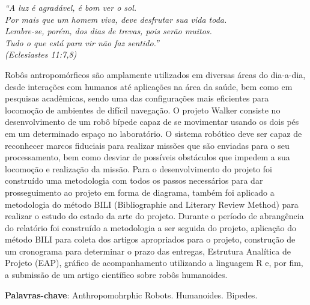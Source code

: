 \documentclass[
	12pt,				%
	openright,			%
	twoside,			%
	a4paper,			%
	english,			%
	french,				%
	spanish,			%
	brazil				%
	]{senai-cimatec-abntex2}
\begin{document}
\begin{epigrafe}
	\vspace*{\fill}
	\begin{flushright}
		\textit{``A luz é agradável, é bom ver o sol.\\
			Por mais que um homem viva, deve desfrutar sua vida toda.\\ Lembre-se, porém, dos dias de trevas, pois serão muitos. \\ Tudo o que está para vir não faz sentido.''\\
			(Eclesiastes 11:7,8)}
	\end{flushright}
\end{epigrafe}

\setlength{\absparsep}{18pt} %
\begin{resumo}

	Robôs antropomórficos são amplamente utilizados em diversas áreas do dia-a-dia, desde interações com humanos até aplicações na área da saúde, bem como em pesquisas acadêmicas, sendo uma das configurações mais eficientes para locomoção de ambientes de difícil navegação. \newline
	O projeto Walker consiste no desenvolvimento de um robô bípede capaz de se movimentar usando os dois pés em um determinado espaço no laboratório. O sistema robótico deve ser capaz de reconhecer marcos fiduciais para realizar missões que são enviadas para o seu processamento, bem como desviar de possíveis obstáculos que impedem a sua locomoção e realização da missão.\newline
	Para o desenvolvimento do projeto foi construído uma metodologia com todos os passos necessários para dar prosseguimento ao projeto em forma de diagrama, também foi aplicado a metodologia do método BILI (Bibliographie and Literary Review Method) para realizar o estudo do estado da arte do projeto.\newline
	Durante o período de abrangência do relatório foi construído a metodologia a ser seguida do projeto, aplicação do método BILI para coleta dos artigos apropriados para o projeto, construção de um cronograma para determinar o prazo das entregas, Estrutura Analítica de Projeto (EAP), gráfico de acompanhamento utilizando a linguagem R e, por fim, a submissão de um artigo científico sobre robôs humanoides.\newline

	\textbf{Palavras-chave}: Anthropomohrphic Robots. Humanoides. Bipedes.
\end{resumo}
\end{document}
